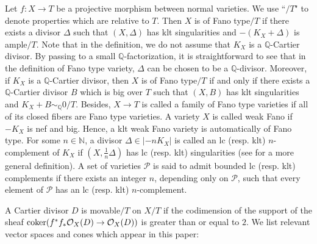 \documentclass[11pt,oneside,reqno]{amsart}
\numberwithin{equation}{section}
\theoremstyle{definition}
\newcommand{\bQ}{\mathbb{Q}}
\begin{document}
 Let $f: X \to T$ be a projective morphism between normal varieties. We use ``$/T$" to denote properties which are relative to $T$. Then $X$ is of Fano type$/T$ if there exists a divisor $\Delta$ such that $(X, \Delta)$ has klt singularities and $-(K_X+\Delta)$ is ample$/T$. Note that in the definition, we do not assume that $K_X$ is a $\bQ$-Cartier divisor. By passing to a small $\bQ$-factorization, it is straightforward to see that in the definition of Fano type variety, $\Delta$ can be chosen to be a $\bQ$-divisor. Moreover, if $K_X$ is a $\bQ$-Cartier divisor, then $X$ is of Fano type$/T$ if and only if there exists a $\bQ$-Cartier divisor $B$ which is big over $T$ such that $(X, B)$ has klt singularities and $K_X+B \sim_{\bQ} 0/T$. Besides, $X \to T$ is called a family of Fano type varieties if all of its closed fibers are Fano type varieties. A variety $X$ is called weak Fano if $-K_X$ is nef and big. Hence, a klt weak Fano variety is automatically of Fano type. For some $n \in \mathbb{N}$, a divisor $\Delta \in |-nK_X|$ is called an lc (resp. klt) $n$-complement of $K_X$ if $(X, \frac{1}{n}\Delta)$ has lc (resp. klt) singularities (see \cite{PS09} for a more general definition). A set of varieties $\mathcal{P}$ is said to admit bounded lc (resp. klt) complements if there exists an integer $n$, depending only on $\mathcal{P}$, such that every element of $\mathcal{P}$ has an lc (resp. klt) $n$-complement.

A Cartier divisor $D$ is movable$/T$ on $X/T$ if the codimension of the support of the sheaf ${\rm coker}(f^*f_*\mathcal O_X(D) \to \mathcal O_X(D))$ is greater than or equal to $2$. 
We list relevant vector spaces and cones which appear in this paper:
\end{document}
